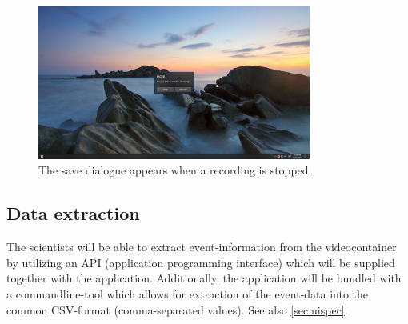 \begin{figure}[H]
  \includegraphics[width=0.8\textwidth, trim={20cm 10cm 20cm 10cm}, clip]{resources/ui_save_dialogue.png}
  \centering
  \caption{The save dialogue appears when a recording is stopped.}
  \label{fig:sm_ui_saving}
\end{figure}

\subsection{Data extraction}
\label{sec:sm_extraction}
The \glspl{scientist} will be able to extract \gls{event}-information from the videocontainer by utilizing an API (application programming interface) which will be supplied together with the application. Additionally, the application will be bundled with a commandline-tool which allows for extraction of the \gls{event}-data into the common CSV-format (comma-separated values). See also \ref{sec:uispec}.